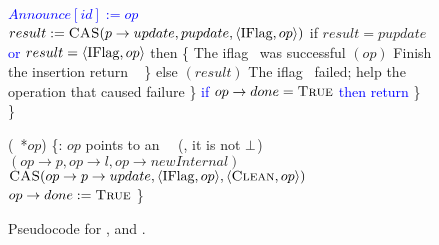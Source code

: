 \begin{figure*}
\begin{code}
		\textcolor{blue}{$Announce[id] := op$} \label{insert-write-announce} \nlc
		$result := \mbox{\sc CAS}(p\rightarrow update, pupdate, \langle \mbox{IFlag}, op\rangle)$ \label{iflag-cas} \nlc
		if $result = pupdate$ \textcolor{blue}{or $result = \langle \mbox{IFlag},op \rangle$} then \{ \tabtabcom The iflag \CASB\ was successful\nlc
		\n            {}$(op)$ \tabtabcom Finish the insertion\label{finish-insert}\nlc
		return \TRUE\ \label{insert-true}\nlc
		\p        \}\nlc 
		else $(result)$ \tabcom The iflag \CASB\ failed; help the operation that caused failure\label{ins-help-after-failure}\nlc
		\p    \}\nlc
		\textcolor{blue}{if $op \rightarrow done = \mbox{\sc True}$ then} \nlc
		\n		\textcolor{blue}{return \TRUE} \nlc \p
		\p\}\nlc 
		\p
		\}\bl
		\nlc
		
		(\IFlag\ *$op$) \{\ul
		\n     {}:  $op$ points to an \IFlag\ \record\  (\ie, it is not $\mbox{$\bot$}$)\nlc
		$(op\rightarrow p, op\rightarrow l, op\rightarrow newInternal)$ \label{ichild-cas}\nlc
		$\mbox{\sc CAS}(op\rightarrow p\rightarrow update, \langle \mbox{IFlag}, op \rangle, \langle \mbox{\sc Clean}, op\rangle)$  \label{iunflag-cas}\nlc
		\textcolor{blue}{$op \rightarrow done := \mbox{\sc True}$} \nlc 
		\p
		\}
	\end{code}
	\caption{\label{code2}Pseudocode for ,  and .}
\end{figure*}

